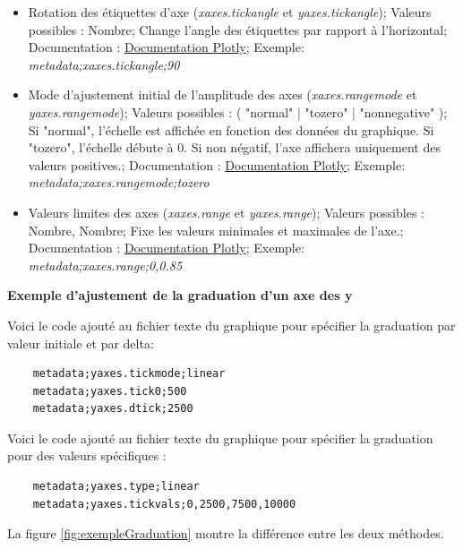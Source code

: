 \documentclass[11pt]{article}
\begin{document}
\begin{itemize}
    \item Rotation des étiquettes d'axe (\textit{xaxes.tickangle} et \textit{yaxes.tickangle}); Valeurs possibles : Nombre; Change l'angle des étiquettes par rapport à l'horizontal; Documentation : \href{https://plotly.com/python/reference/layout/xaxis/#layout-xaxis-tickangle}{Documentation Plotly}; Exemple: \textit{metadata;xaxes.tickangle;90}
    \item Mode d'ajustement initial de l'amplitude des axes (\textit{xaxes.rangemode} et \textit{yaxes.rangemode}); Valeurs possibles : ( "normal" | "tozero" | "nonnegative" ); Si "normal", l'échelle est affichée en fonction des données du graphique. Si "tozero", l'échelle débute à 0. Si non négatif, l'axe affichera uniquement des valeurs positives.; Documentation : \href{https://plotly.com/python/reference/layout/yaxis/#layout-yaxis-rangemode}{Documentation Plotly}; Exemple: \textit{metadata;xaxes.rangemode;tozero}
    \item Valeurs limites des axes (\textit{xaxes.range} et \textit{yaxes.range}); Valeurs possibles : Nombre, Nombre; Fixe les valeurs minimales et maximales de l'axe.; Documentation : \href{https://plotly.com/python/reference/layout/yaxis/#layout-yaxis-range}{Documentation Plotly}; Exemple: \textit{metadata;xaxes.range;0,0.85}
\end{itemize}

\vspace{0.2cm}
\textbf{Exemple d'ajustement de la graduation d'un axe des y}

Voici le code ajouté au fichier texte du graphique pour spécifier la graduation par valeur initiale et par delta:

\begin{lstlisting}
    metadata;yaxes.tickmode;linear
    metadata;yaxes.tick0;500
    metadata;yaxes.dtick;2500
\end{lstlisting}

Voici le code ajouté au fichier texte du graphique pour spécifier la graduation pour des valeurs spécifiques :

\begin{lstlisting}
    metadata;yaxes.type;linear
    metadata;yaxes.tickvals;0,2500,7500,10000
\end{lstlisting}

La figure \ref{fig:exempleGraduation} montre la différence entre les deux méthodes.
\end{document}
